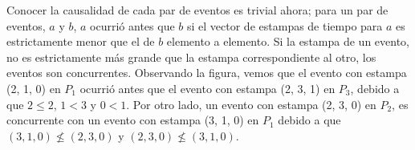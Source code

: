 \documentclass[12pt]{article}
\begin{document}
Conocer la causalidad de cada par de eventos es trivial ahora;
para un par de eventos,
$a$ y $b$,
$a$ ocurrió antes que $b$ si el vector de estampas de tiempo para $a$ es estrictamente menor que el de $b$ elemento a elemento.
Si la estampa de un evento,
no es estrictamente más grande que la estampa correspondiente al otro,
los eventos son concurrentes.
Observando la figura,
vemos que el evento con estampa (2, 1, 0) en $P_1$
ocurrió antes que el evento con estampa (2, 3, 1) en $P_3$,
debido a que $2 \leqslant 2$,
$1 < 3$
y
$0 < 1$.
Por otro lado,
un evento con estampa (2, 3, 0) en $P_2$,
es concurrente con un evento con estampa (3, 1, 0) en $P_1$ debido a que
$(3, 1, 0) \nleqslant (2, 3, 0)$
y
$(2, 3, 0) \nleqslant (3, 1, 0)$.
\end{document}
